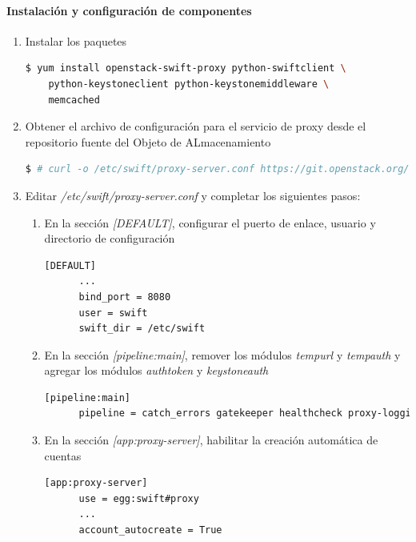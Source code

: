 \documentclass{article}
\begin{document}
\paragraph{Instalaci\'on y configuraci\'on de componentes}

\begin{enumerate}
  \item Instalar los paquetes
  \begin{lstlisting}[language=bash]
    $ yum install openstack-swift-proxy python-swiftclient \
    python-keystoneclient python-keystonemiddleware \
    memcached
  \end{lstlisting}

  \item Obtener el archivo de configuraci\'on para el servicio de proxy desde el repositorio fuente del Objeto de ALmacenamiento
  \begin{lstlisting}[language=bash]
    $ # curl -o /etc/swift/proxy-server.conf https://git.openstack.org/cgit/openstack/swift/plain/etc/proxy-server.conf-sample?h=stable/mitaka
  \end{lstlisting}

  \item Editar \emph{/etc/swift/proxy-server.conf} y completar los siguientes pasos:
  \begin{enumerate}
    \item En la secci\'on \emph{[DEFAULT]}, configurar el puerto de enlace, usuario y directorio de configuraci\'on
    \begin{lstlisting}[language=bash]
      [DEFAULT]
      ...
      bind_port = 8080
      user = swift
      swift_dir = /etc/swift
    \end{lstlisting}
    
    \item En la secci\'on \emph{[pipeline:main]}, remover los m\'odulos \emph{tempurl} y \emph{tempauth} y agregar los m\'odulos \emph{authtoken} y \emph{keystoneauth}
    \begin{lstlisting}[language=bash]
      [pipeline:main]
      pipeline = catch_errors gatekeeper healthcheck proxy-logging cache container_sync bulk ratelimit authtoken keystoneauth container-quotas account-quotas slo dlo versioned_writes proxy-logging proxy-server
    \end{lstlisting}
    
    \item En la secci\'on \emph{[app:proxy-server]}, habilitar la creaci\'on autom\'atica de cuentas
    \begin{lstlisting}[language=bash]
      [app:proxy-server]
      use = egg:swift#proxy
      ...
      account_autocreate = True
    \end{lstlisting}
    

\end{enumerate}
\end{enumerate}
\end{document}
